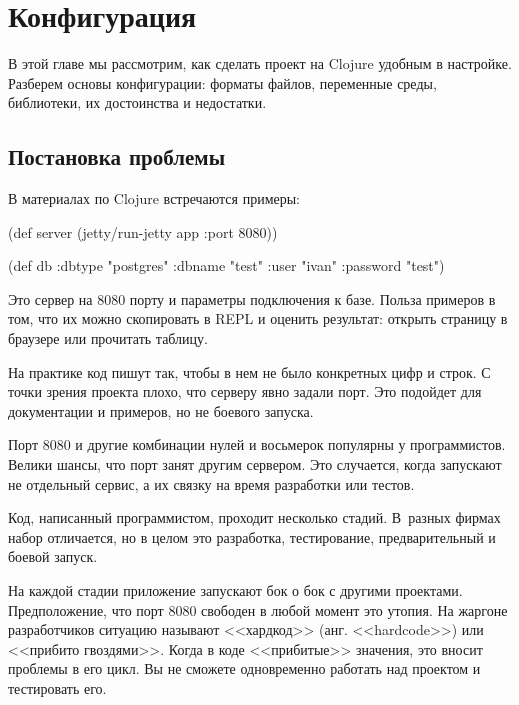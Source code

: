 \chapter{Конфигурация}


\label{chapter-config}

\begin{teaser}
В этой главе мы рассмотрим, как сделать проект на Clojure удобным в
настройке. Разберем основы конфигурации: форматы файлов, переменные среды,
библиотеки, их достоинства и недостатки.
\end{teaser}

\section{Постановка проблемы}

В материалах по Clojure встречаются примеры:

\begin{english}
  \begin{clojure}
(def server
  (jetty/run-jetty app {:port 8080}))

(def db {:dbtype   "postgres"
         :dbname   "test"
         :user     "ivan"
         :password "test"})
  \end{clojure}
\end{english}

Это сервер на 8080 порту и параметры подключения к базе. Польза примеров в том,
что их можно скопировать в REPL и оценить результат: открыть страницу в браузере
или прочитать таблицу.

На практике код пишут так, чтобы в нем не было конкретных цифр и строк. С точки
зрения проекта плохо, что серверу явно задали порт. Это подойдет для
документации и примеров, но не боевого запуска.

Порт 8080 и другие комбинации нулей и восьмерок популярны у
программистов. Велики шансы, что порт занят другим сервером. Это случается,
когда запускают не отдельный сервис, а их связку на время разработки или тестов.

Код, написанный программистом, проходит несколько стадий. В~разных фирмах набор
отличается, но в целом это разработка, тестирование, предварительный и боевой
запуск.


На каждой стадии приложение запускают бок о бок с другими
проектами. Предположение, что порт 8080 свободен в любой момент это утопия. На
жаргоне разработчиков ситуацию называют <<хардкод>> (анг. <<hardcode>>) или
<<прибито гвоздями>>. Когда в коде <<прибитые>> значения, это вносит проблемы в
его цикл. Вы не сможете одновременно работать над проектом и тестировать его.

